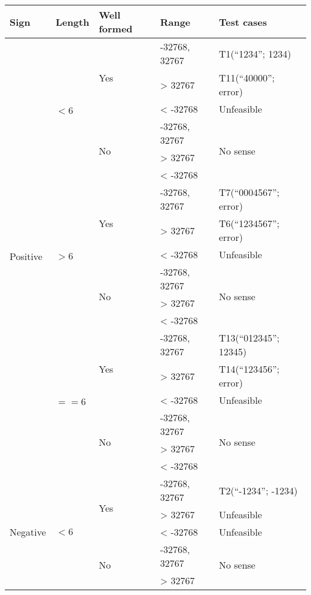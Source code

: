 \begin{table}
\centering
\small
\begin{tabular}{|l|l|l|l|l|}
\hline
\textbf{Sign} & \textbf{Length} & \textbf{Well formed} & \textbf{Range} & \textbf{Test cases} \\
\hline
\multirow{18}{*}{Positive} & \multirow{6}{*}{$< 6$} & \multirow{3}{*}{Yes} & -32768, 32767 & T1(``1234''; 1234) \\
\cline{4-5}
& & & > 32767 & T11(``40000''; error) \\
\cline{4-5}
& & & < -32768 & Unfeasible \\
\cline{3-5}
& & \multirow{3}{*}{No} & -32768, 32767 & \multirow{3}{*}{No sense} \\
\cline{4-4}
& & & > 32767 & \\
\cline{4-4}
& & & < -32768 & \\
\cline{2-5}
& \multirow{6}{*}{$> 6$} & \multirow{3}{*}{Yes} & -32768, 32767 & T7(``0004567''; error) \\
\cline{4-5}
& & & > 32767 & T6(``1234567''; error) \\
\cline{4-5}
& & & < -32768 & Unfeasible \\
\cline{3-5}
& & \multirow{3}{*}{No} & -32768, 32767 &  \multirow{3}{*}{No sense} \\
\cline{4-4}
& & & > 32767 & \\
\cline{4-4}
& & & < -32768 & \\
\cline{2-5}
& \multirow{6}{*}{$== 6$} & \multirow{3}{*}{Yes} & -32768, 32767 & T13(``012345''; 12345) \\
\cline{4-5}
& & & > 32767 & T14(``123456''; error) \\
\cline{4-5}
& & & < -32768 & Unfeasible \\
\cline{3-5}
& & \multirow{3}{*}{No} & -32768, 32767 & \multirow{3}{*}{No sense} \\
\cline{4-4}
& & & > 32767 & \\
\cline{4-4}
& & & < -32768 & \\
\cline{1-5}
\multirow{18}{*}{Negative} & \multirow{6}{*}{$< 6$} & \multirow{3}{*}{Yes} & -32768, 32767 & T2(``-1234''; -1234) \\
\cline{4-5}
& & & > 32767 & Unfeasible \\
\cline{4-5}
& & & < -32768 & Unfeasible \\
\cline{3-5}
& & \multirow{3}{*}{No} & -32768, 32767 & \multirow{3}{*}{No sense} \\
\cline{4-4}
& & & > 32767 & \\
\cline{4-4}

\end{tabular}
\end{table}
